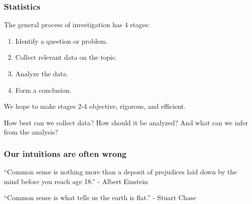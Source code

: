 \begin{frame}
\frametitle{Statistics}
The general process of investigation has 4 stages:
\begin{enumerate}
\item Identify a question or problem.
\item Collect relevant data on the topic.
\item Analyze the data.
\item Form a conclusion.
\end{enumerate}
We hope to make stages 2-4 objective, rigorous, and efficient.

How best can we collect data? How
should it be analyzed? And what can we infer from the analysis?
\end{frame}



\begin{frame}
\frametitle{Our intuitions are often wrong}
``Common sense is nothing more than a deposit of prejudices laid down by the mind before you reach age 18.'' - Albert Einstein

\pause

``Common sense is what tells us the earth is flat.'' - Stuart Chase

\pause

\vspace{20pt}


\end{frame}

